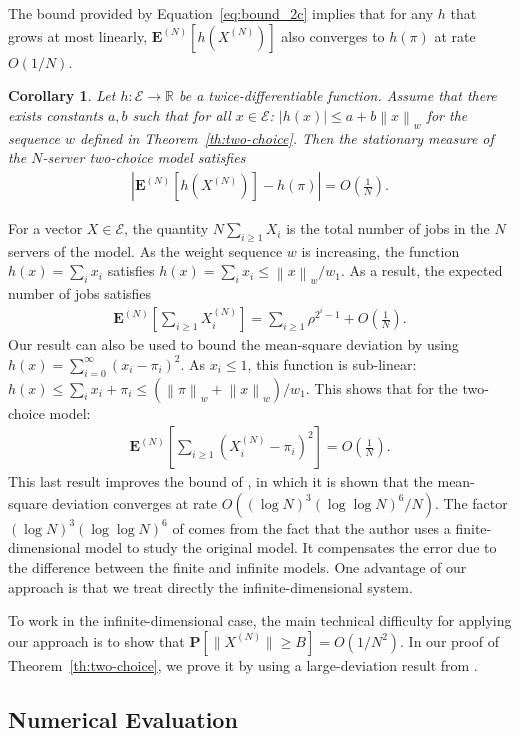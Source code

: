 \documentclass[sigconf]{acmart}
\newcommand\XN{X^{(N)}}
\newcommand\E{\mathcal{E}}
\newcommand\R{\mathbb{R}}
\newcommand\espN[1]{\mathbf{E}^{(N)}\left[#1\right]}
\newcommand\sespN[1]{\mathbf{E}^{(N)}[#1]}
\newcommand\sProba[1]{\mathbf{P}[#1]}
\newcommand\norm[1]{\left\|#1\right\|}
\newcommand\snorm[1]{\|#1\|}
\newcommand\abs[1]{\left|#1\right|}
\newcommand\p[1]{\left(#1\right)}
\newtheorem{coro}{Corollary}
\begin{document}
The bound provided by Equation~\eqref{eq:bound_2c} implies that for
any $h$ that grows at most linearly, $\sespN{h(\XN)}$ also converges
to $h(\pi)$ at rate $O(1/N)$.
\begin{coro}
  \label{coro:two-choice}
  Let $h:\E\to\R$ be a twice-differentiable function. Assume that
  there exists constants $a,b$ such that for all $x\in\E$:
  $|h(x)|\le a+b\norm{x}_w$ for the sequence $w$ defined in
  Theorem~\ref{th:two-choice}. Then the stationary measure of the
  $N$-server two-choice model satisfies
  \begin{align*}
    \abs{\espN{h(\XN)}-h(\pi)}=O\p{\frac1N}.
  \end{align*}
\end{coro}
For a vector $X\in\E$, the quantity
$N\sum_{i\ge 1}X_i$ is the total number of jobs in the $N$ servers of
the model. As the weight sequence $w$ is increasing, the function
$h(x)=\sum_ix_i$ satisfies $h(x)=\sum_ix_i\le \norm{x}_w/w_1$. As a
result, the expected number of jobs satisfies
\begin{align}
  \label{eq:avg_2c}
  \espN{\sum_{i\ge1}\XN_i} 
  = \sum_{i\ge1} \rho^{2^i-1} +
  O\p{\frac1N}.
\end{align}
Our result can also be used to bound the mean-square deviation by
using $h(x)=\sum_{i=0}^\infty(x_i-\pi_i)^2$. As $x_i\le1$, this
function is sub-linear:
$h(x)\le \sum_ix_i+\pi_i \le (\norm{\pi}_w + \norm{x}_w)/w_1$. This
shows that for the two-choice model:
\begin{align*}
  \espN{\sum_{i\ge1}(\XN_i-\pi_i)^2} = O\p{\frac1N}. 
\end{align*}
This last result improves the bound of \cite{ying2016twochoice}, in
which it is shown that the mean-square deviation
converges at rate $O((\log N)^3(\log\log N)^6 /N)$. The factor
$(\log N)^3(\log\log N)^6$ of \cite{ying2016twochoice} comes from the
fact that the author uses a finite-dimensional model to study the
original model.  It compensates the error due to the difference
between the finite and infinite models.  One advantage of our approach
is that we treat directly the infinite-dimensional system. 


To work in the infinite-dimensional case, the main technical
difficulty for applying our approach is to show that
$\sProba{\snorm{\XN}\ge B}=O(1/N^2)$. In our proof of
Theorem~\ref{th:two-choice}, we prove it by using a large-deviation
result from \cite{luczak2007asymptotic}.


\subsection{Numerical Evaluation}
\end{document}
